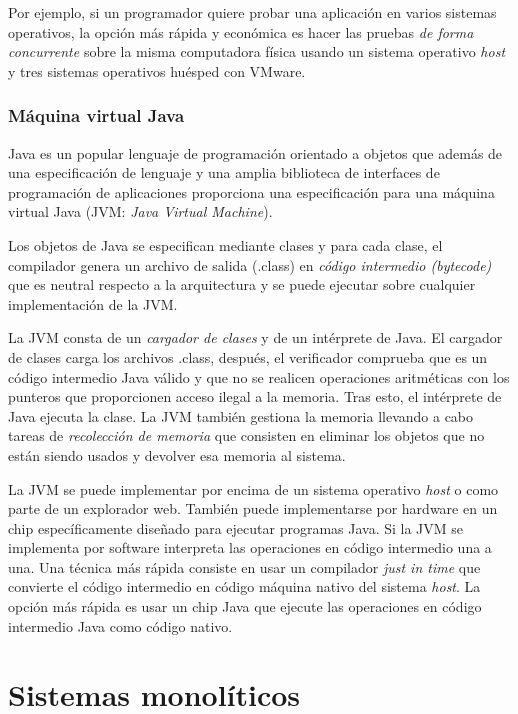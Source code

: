 \documentclass[10pt,a4paper,spanish]{report}
\begin{document}
  \noindent
  Por ejemplo, si un programador quiere probar una aplicación en varios sistemas operativos, la opción más rápida y económica es hacer las pruebas \textit{de forma concurrente} sobre la misma computadora física usando un sistema operativo \textit{host} y tres sistemas operativos huésped con VMware.

  \subsubsection{Máquina virtual Java}
  \noindent
  Java es un popular lenguaje de programación orientado a objetos que además de una especificación de lenguaje y una amplia biblioteca de interfaces de programación de aplicaciones proporciona una especificación para una máquina virtual Java (JVM: \textit{Java Virtual Machine}).

  \noindent
  Los objetos de Java se especifican mediante clases y para cada clase, el compilador genera un archivo de salida (.class) en \textit{código intermedio (bytecode)} que es neutral respecto a la arquitectura y se puede ejecutar sobre cualquier implementación de la JVM.

  \noindent
  La JVM consta de un \textit{cargador de clases} y de un intérprete de Java. El cargador de clases carga los archivos .class, después, el verificador comprueba que es un código intermedio Java válido y que no se realicen operaciones aritméticas con los punteros que proporcionen acceso ilegal a la memoria. Tras esto, el intérprete de Java ejecuta la clase. La JVM también gestiona la memoria llevando a cabo tareas de \textit{recolección de memoria} que consisten en eliminar los objetos que no están siendo usados y devolver esa memoria al sistema.

  \noindent
  La JVM se puede implementar por encima de un sistema operativo \textit{host} o como parte de un explorador web. También puede implementarse por hardware en un chip específicamente diseñado para ejecutar programas Java. Si la JVM se implementa por software interpreta las operaciones en código intermedio una a una. Una técnica más rápida consiste en usar un compilador \textit{just in time} que convierte el código intermedio en código máquina nativo del sistema \textit{host}. La opción más rápida es usar un chip Java que ejecute las operaciones en código intermedio Java como código nativo.



  \section{Sistemas monolíticos}
\end{document}
